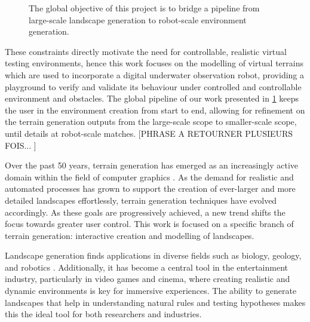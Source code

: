 

\begin{figure}
    \caption{The global objective of this project is to bridge a pipeline from large-scale landscape generation to robot-scale environment generation. }
    \label{fig:intro-user-to-simu-pipeline}
\end{figure}



These constraints directly motivate the need for controllable, realistic virtual testing environments, hence this work focuses on the modelling of virtual terrains which are used to incorporate a digital underwater observation robot, providing a playground to verify and validate its behaviour under controlled and controllable environment and obstacles. The global pipeline of our work presented in \cref{fig:intro-user-to-simu-pipeline} keeps the user in the environment creation from start to end, allowing for refinement on the terrain generation outputs from the large-scale scope to smaller-scale scope, until details at robot-scale matches. [PHRASE A RETOURNER PLUSIEURS FOIS... ]

Over the past 50 years, terrain generation has emerged as an increasingly active domain within the field of computer graphics \cite{Fournier1982,Musgrave1989,Miller1986,Galin2019}. As the demand for realistic and automated processes has grown to support the creation of ever-larger and more detailed landscapes effortlessly, terrain generation techniques have evolved accordingly. As these goals are progressively achieved, a new trend shifts the focus towards greater user control. This work is focused on a specific branch of terrain generation: interactive creation and modelling of landscapes.

Landscape generation finds applications in diverse fields such as biology, geology, and robotics \cite{Tzachor2023,Chen2023,Gerigk2025,Rudin2022}. Additionally, it has become a central tool in the entertainment industry, particularly in video games and cinema, where creating realistic and dynamic environments is key for immersive experiences. The ability to generate landscapes that help in understanding natural rules and testing hypotheses makes this the ideal tool for both researchers and industries.

